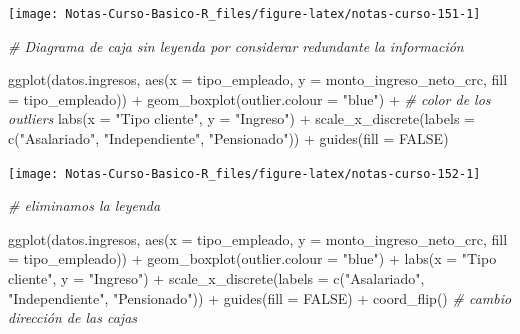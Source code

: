 \documentclass[
  12pt,
]{book}
\newenvironment{Shaded}{\begin{snugshade}}{\end{snugshade}}
\newcommand{\AttributeTok}[1]{\textcolor[rgb]{0.77,0.63,0.00}{#1}}
\newcommand{\CommentTok}[1]{\textcolor[rgb]{0.56,0.35,0.01}{\textit{#1}}}
\newcommand{\ConstantTok}[1]{\textcolor[rgb]{0.00,0.00,0.00}{#1}}
\newcommand{\FunctionTok}[1]{\textcolor[rgb]{0.00,0.00,0.00}{#1}}
\newcommand{\NormalTok}[1]{#1}
\newcommand{\SpecialCharTok}[1]{\textcolor[rgb]{0.00,0.00,0.00}{#1}}
\newcommand{\StringTok}[1]{\textcolor[rgb]{0.31,0.60,0.02}{#1}}
\begin{document}
\begin{center}\texttt{[image: Notas-Curso-Basico-R\_files/figure-latex/notas-curso-151-1]} \end{center}

\begin{Shaded}
\begin{Highlighting}[]
\CommentTok{\# Diagrama de caja sin leyenda por considerar redundante la información}

\FunctionTok{ggplot}\NormalTok{(datos.ingresos, }\FunctionTok{aes}\NormalTok{(}\AttributeTok{x =}\NormalTok{ tipo\_empleado, }\AttributeTok{y =}\NormalTok{ monto\_ingreso\_neto\_crc, }\AttributeTok{fill =}\NormalTok{ tipo\_empleado))   }\SpecialCharTok{+}
  \FunctionTok{geom\_boxplot}\NormalTok{(}\AttributeTok{outlier.colour =} \StringTok{"blue"}\NormalTok{) }\SpecialCharTok{+}             \CommentTok{\# color de los outliers}
  \FunctionTok{labs}\NormalTok{(}\AttributeTok{x =} \StringTok{"Tipo cliente"}\NormalTok{, }\AttributeTok{y =} \StringTok{"Ingreso"}\NormalTok{) }\SpecialCharTok{+}
  \FunctionTok{scale\_x\_discrete}\NormalTok{(}\AttributeTok{labels =} \FunctionTok{c}\NormalTok{(}\StringTok{"Asalariado"}\NormalTok{, }\StringTok{"Independiente"}\NormalTok{, }\StringTok{"Pensionado"}\NormalTok{)) }\SpecialCharTok{+}
  \FunctionTok{guides}\NormalTok{(}\AttributeTok{fill =} \ConstantTok{FALSE}\NormalTok{)}
\end{Highlighting}
\end{Shaded}

\begin{center}\texttt{[image: Notas-Curso-Basico-R\_files/figure-latex/notas-curso-152-1]} \end{center}

\begin{Shaded}
\begin{Highlighting}[]
\CommentTok{\# eliminamos la leyenda}
\end{Highlighting}
\end{Shaded}

\begin{Shaded}
\begin{Highlighting}[]
\FunctionTok{ggplot}\NormalTok{(datos.ingresos, }\FunctionTok{aes}\NormalTok{(}\AttributeTok{x =}\NormalTok{ tipo\_empleado, }\AttributeTok{y =}\NormalTok{ monto\_ingreso\_neto\_crc, }\AttributeTok{fill =}\NormalTok{ tipo\_empleado))  }\SpecialCharTok{+}
  \FunctionTok{geom\_boxplot}\NormalTok{(}\AttributeTok{outlier.colour =} \StringTok{"blue"}\NormalTok{) }\SpecialCharTok{+}
  \FunctionTok{labs}\NormalTok{(}\AttributeTok{x =} \StringTok{"Tipo cliente"}\NormalTok{, }\AttributeTok{y =} \StringTok{"Ingreso"}\NormalTok{) }\SpecialCharTok{+}
  \FunctionTok{scale\_x\_discrete}\NormalTok{(}\AttributeTok{labels =} \FunctionTok{c}\NormalTok{(}\StringTok{"Asalariado"}\NormalTok{, }\StringTok{"Independiente"}\NormalTok{, }\StringTok{"Pensionado"}\NormalTok{)) }\SpecialCharTok{+}
  \FunctionTok{guides}\NormalTok{(}\AttributeTok{fill =} \ConstantTok{FALSE}\NormalTok{) }\SpecialCharTok{+}
  \FunctionTok{coord\_flip}\NormalTok{()                       }\CommentTok{\# cambio dirección de las cajas}
\end{Highlighting}
\end{Shaded}
\end{document}
